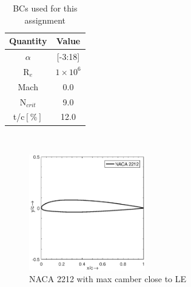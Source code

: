 \documentclass[main.tex]{subfiles}
\begin{document}
\begin{table}[h]\begin{center}\begin{tabular}{ c c } 
 \hline \rowcolor{lightgray}
  \hspace{0.5cm}Quantity\hspace{0.5cm} & \hspace{0.5cm}Value\hspace{0.5cm} \\
  \hline
  $\alpha$ & [-3:18]\\
 \hline
  R$_e$ & $1\times10^6$  \\ 
   \hline
  Mach & 0.0  \\ 
   \hline
  N$_{crit}$ & 9.0  \\ 
 \hline
  t/c$[\%]$ & 12.0  \\ 
\hline
\end{tabular}\caption{BCs used for this assignment}\vspace*{-1em}\label{table2}\end{center}\end{table}
\\
\begin{figure}[h!]
\vspace*{-4em}\centering
\includegraphics[width=0.45\textwidth]{./Images/Ass3/NACA2212}\vspace*{-1.3em}
\caption{NACA 2212 with max camber close to LE}\vspace*{-1.0em}
\label{Fig1}
\end{figure}\vspace*{-1.0em}
\\
\end{document}
